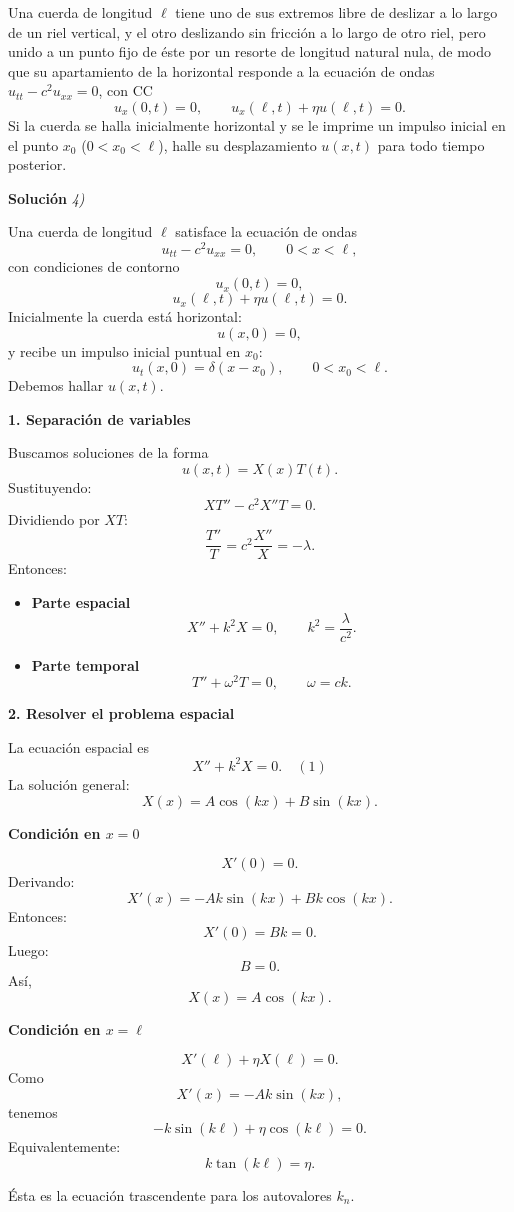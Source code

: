 \documentclass[11pt,spanish]{article}
\newcounter{problema}
\newcommand{\prob}{\stepcounter{problema} \vspace{.5cm} \noindent{\bf Problema \arabic{problema}: }}
\begin{document}
\prob Una cuerda de longitud $\ell$ tiene uno de sus extremos libre de deslizar a lo largo de un riel vertical, y el otro deslizando sin fricci\'on a lo largo de otro riel, pero unido a un punto fijo de \'este por un resorte de longitud natural nula, de modo que su apartamiento de la horizontal responde a la ecuaci\'on de ondas $u_{tt}-c^2 u_{xx}=0$, con CC
\[
u_x(0,t)=0, \qquad u_x(\ell,t)+\eta u(\ell,t)=0.
\]
Si la cuerda se halla inicialmente horizontal y se le imprime un impulso inicial en el punto $x_0$ ($0<x_0<\ell$), halle su desplazamiento $u(x,t)$ para todo tiempo posterior.

\vspace{0.5cm}
{\bf Soluci\'on }{\em 4)}
\vspace{0.5cm}

Una cuerda de longitud $\ell$ satisface la ecuación de ondas
$$
u_{tt}-c^2u_{xx}=0,
\qquad
0<x<\ell,
$$
con condiciones de contorno
$$
u_x(0,t)=0,
$$
$$
u_x(\ell,t)+\eta u(\ell,t)=0.
$$
Inicialmente la cuerda está horizontal:
$$
u(x,0)=0,
$$
y recibe un impulso inicial puntual en $x_0$:
$$
u_t(x,0)=\delta(x-x_0),
\qquad
0<x_0<\ell.
$$
Debemos hallar $u(x,t)$.

{\bf 1. Separación de variables}

Buscamos soluciones de la forma
$$
u(x,t)=X(x)T(t).
$$
Sustituyendo:
$$
XT''-c^2X''T=0.
$$
Dividiendo por $XT$:
$$
\frac{T''}{T}
=
c^2\frac{X''}{X}
=
-\lambda.
$$
Entonces:
\begin{itemize}
\item {\bf Parte espacial}
$$
X''+k^2X=0,
\qquad
k^2=\frac{\lambda}{c^2}.
$$
\item {\bf Parte temporal}
$$
T''+\omega^2T=0,
\qquad
\omega=ck.
$$
\end{itemize}

{\bf 2. Resolver el problema espacial}

La ecuación espacial es
$$
X''+k^2X=0.
\quad (1)
$$
La solución general:
$$
X(x)=A\cos(kx)+B\sin(kx).
$$

{\bf Condición en $x=0$}

$$
X'(0)=0.
$$
Derivando:
$$
X'(x)=-Ak\sin(kx)+Bk\cos(kx).
$$
Entonces:
$$
X'(0)=Bk=0.
$$
Luego:
$$
B=0.
$$
Así,
$$
X(x)=A\cos(kx).
$$

{\bf Condición en $x=\ell$}

$$
X'(\ell)+\eta X(\ell)=0.
$$
Como
$$
X'(x)=-Ak\sin(kx),
$$
tenemos
$$
-k\sin(k\ell)+\eta\cos(k\ell)=0.
$$
Equivalentemente:
$$
\boxed{
k\tan(k\ell)=\eta.
}
$$

Ésta es la ecuación trascendente para los autovalores $k_n$.
\end{document}
